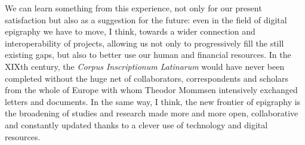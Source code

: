 We can learn something from this experience, not only for our present satisfaction but also as a suggestion for the future: even in the field of digital epigraphy we have to move, I think, towards a wider connection and interoperability of projects, allowing us not only to progressively fill the still existing gaps, but also to better use our human and financial resources.
In the XIXth century, the \emph{Corpus Inscriptionum Latinarum} would have never been completed without the huge net of collaborators, correspondents and scholars from the whole of Europe with whom Theodor Mommsen intensively exchanged letters and documents. In the same way, I think, the new frontier of epigraphy is the broadening of studies and research made more and more open, collaborative and constantly updated thanks to a clever use of technology and digital resources.


